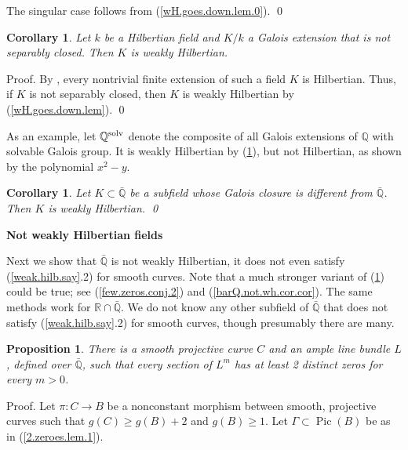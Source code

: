 \documentclass{amsart}
\newtheorem{cor}[thm]{Corollary}
\newtheorem{prop}[thm]{Proposition}
\theoremstyle{definition}
\theoremstyle{remark}
\renewcommand{\r}[0]{{\mathbb R}}
\newcommand{\q}[0]{{\mathbb Q}}
\newcommand{\pic}[0]{\operatorname{Pic}}
\begin{document}
The singular case follows from (\ref{wH.goes.down.lem.0}).
\qed 






\begin{cor}\label{wH.goes.down.cor.1}  Let $k$ be a  Hilbertian field and 
 $K/k$  a Galois extension that is not    separably closed. Then $K$ is 
 weakly Hilbertian.
\end{cor}

Proof. By \cite{MR667458},  every nontrivial finite extension of such a field $K$  is  Hilbertian.  Thus, if  $K$ is not separably closed, then   
$K$  is  weakly Hilbertian  by (\ref{wH.goes.down.lem}). 
\qed

\medskip
As an  example,  let $\q^{\rm solv} $ denote the composite of all  Galois extensions
of $\q$ with solvable Galois group. It is   weakly Hilbertian by
(\ref{wH.goes.down.cor.1}), but  not Hilbertian, as shown by the polynomial $x^2-y$.

\begin{cor}\label{wH.goes.down.cor}  Let $K\subset \bar \q$ be a subfield whose Galois closure is different from $\bar\q$. Then $K$ is   weakly Hilbertian.  \qed
\end{cor}
  



\medskip
{\bf Not weakly Hilbertian fields}
\medskip


Next we  show  that $\bar\q$ is not weakly Hilbertian, 
it does not even satisfy   (\ref{weak.hilb.say}.2) for smooth curves.
 Note that  a much stronger variant of (\ref{barQ.not.wh.cor}) could be true; 
see (\ref{few.zeros.conj.2}) and (\ref{barQ.not.wh.cor.cor}).
The same methods work for  $\r\cap \bar\q$. We do not know any other subfield of $\bar\q$ that does not  satisfy   (\ref{weak.hilb.say}.2) for smooth curves, though presumably there are many.






\begin{prop} \label{barQ.not.wh.cor}  There is a smooth projective curve $C$ and an ample line bundle $L$, defined over $\bar\q$, such that  every section of $L^m$ has at least 2 distinct zeros  for every $m>0$.
\end{prop}



Proof.  Let $\pi:C\to B$  be a nonconstant morphism between smooth, projective curves
such that $g(C)\geq g(B)+2$ and $g(B)\geq 1$.   Let $\Gamma\subset \pic(B)$ be as in (\ref{2.zeroes.lem.1}). 
\end{document}
